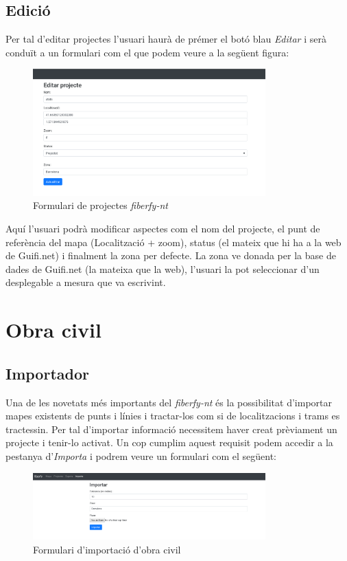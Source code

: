 \documentclass[a4paper]{article}
\begin{document}
	\subsection{Edició}
	Per tal d'editar projectes l'usuari haurà de prémer el botó blau \emph{Editar} i serà conduït a un formulari com el que podem veure a la següent figura:
	
	\begin{figure}[H]
		\centering
		\includegraphics[width=0.8\textwidth]{images/project_edit_form.png}
		\caption{Formulari de projectes \emph{fiberfy-nt}}
	\end{figure}

	Aquí l'usuari podrà modificar aspectes com el nom del projecte, el punt de referència del mapa (Localització + zoom), status (el mateix que hi ha a la web de Guifi.net) i finalment la zona per defecte. La zona ve donada per la base de dades de Guifi.net (la mateixa que la web), l'usuari la pot seleccionar d'un desplegable a mesura que va escrivint.
	
	\newpage
	\section{Obra civil}
	\subsection{Importador}
	Una de les novetats més importants del \emph{fiberfy-nt} és la possibilitat d'importar mapes existents de punts i línies i tractar-los com si de localitzacions i trams es tractessin. Per tal d'importar informació necessitem haver creat prèviament un projecte i tenir-lo activat. Un cop cumplim aquest requisit podem accedir a la pestanya d'\emph{Importa} i podrem veure un formulari com el següent:
	
	\begin{figure}[H]
		\centering
		\includegraphics[width=0.8\textwidth]{images/import_form.png}
		\caption{Formulari d'importació d'obra civil}
		\label{fig:import-form}
	\end{figure}
\end{document}

